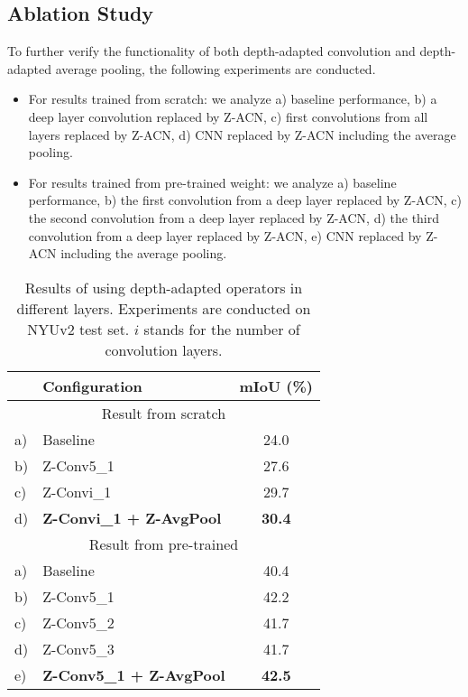 \documentclass[lettersize,journal]{IEEEtran}
\begin{document}
\subsection{Ablation Study} 

To further verify the functionality of both depth-adapted convolution and depth-adapted average pooling, the following experiments are conducted. 
\begin{itemize}
    \item For results trained from scratch: we analyze a) baseline performance, b) a deep layer convolution replaced by Z-ACN, c) first convolutions from all layers replaced by Z-ACN, d) CNN replaced by Z-ACN including the average pooling.
    \item For results trained from pre-trained weight: we analyze a) baseline performance, b) the first convolution from a deep layer replaced by Z-ACN, c) the second convolution from a deep layer replaced by Z-ACN, d) the third convolution from a deep layer replaced by Z-ACN, e) CNN replaced by Z-ACN including the average pooling.
\end{itemize}

\begin{table}[t]
\centering
\setlength\tabcolsep{10pt}
\setlength\extrarowheight{0pt}
\caption{Results of using depth-adapted operators in different layers. Experiments are conducted on NYUv2 test set. $i$ stands for the number of convolution layers.}
\begin{tabular}[ht]{ l |l |c } 
\hline

\hline
 & Configuration & mIoU (\%)  \\
\hline
\multicolumn{3}{c}{Result from scratch} \\
\hline
a) & Baseline & 24.0  \\ 
\hline
b) & Z-Conv5\_1 & 27.6  \\ 
\hline
c) & Z-Convi\_1 & 29.7  \\ 
\hline
d) & \textbf{Z-Convi\_1 + Z-AvgPool} & \textbf{30.4}  \\ 
\hline
\multicolumn{3}{c}{Result from pre-trained} \\
\hline
a) & Baseline & 40.4  \\
\hline
b) & Z-Conv5\_1 & 42.2 \\
\hline
c) & Z-Conv5\_2 & 41.7 \\
\hline
d) & Z-Conv5\_3 & 41.7 \\
\hline
e) & \textbf{Z-Conv5\_1 + Z-AvgPool} & \textbf{42.5} \\
\hline

\hline
\end{tabular}

\label{ablation}
\end{table}
\end{document}
